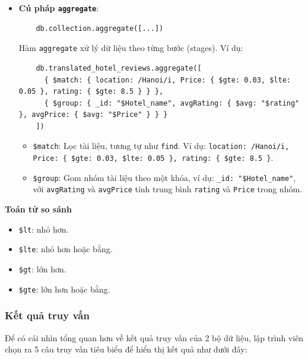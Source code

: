 \begin{itemize}
    \item \textbf{Cú pháp \texttt{aggregate}}: 
    \begin{verbatim}
    db.collection.aggregate([...])
    \end{verbatim}
    Hàm \texttt{aggregate} xử lý dữ liệu theo từng bước (stages). Ví dụ:
    \begin{verbatim}
    db.translated_hotel_reviews.aggregate([
      { $match: { location: /Hanoi/i, Price: { $gte: 0.03, $lte: 0.05 }, rating: { $gte: 8.5 } } },
      { $group: { _id: "$Hotel_name", avgRating: { $avg: "$rating" }, avgPrice: { $avg: "$Price" } } }
    ])
    \end{verbatim}
    \begin{itemize}
        \item \texttt{\$match}: Lọc tài liệu, tương tự như \texttt{find}. Ví dụ: \texttt{location: /Hanoi/i, Price: \{ \$gte: 0.03, \$lte: 0.05 \}, rating: \{ \$gte: 8.5 \}}.
        \item \texttt{\$group}: Gom nhóm tài liệu theo một khóa, ví dụ: \texttt{\_id: "\$Hotel\_name"}, với \texttt{avgRating} và \texttt{avgPrice} tính trung bình \texttt{rating} và \texttt{Price} trong nhóm.
    \end{itemize}
\end{itemize}

\textbf{Toán tử so sánh}
\begin{itemize}
    \item \texttt{\$lt}: nhỏ hơn.
    \item \texttt{\$lte}: nhỏ hơn hoặc bằng.
    \item \texttt{\$gt}: lớn hơn.
    \item \texttt{\$gte}: lớn hơn hoặc bằng.
\end{itemize}

\subsubsection{Kết quả truy vấn}
Để có cái nhìn tổng quan hơn về kết quả truy vấn của 2 bộ dữ liệu, lập trình viên chọn ra 5 câu truy vấn tiêu biểu để hiển thị kết quả như dưới đây:

